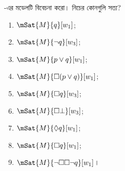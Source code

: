 \documentclass[../../../include/open-logic-section]{subfiles}
\begin{document}
\begin{prob}
  -এর মডেলটি বিবেচনা করো। নিচের কোনগুলি সত্য?
    \begin{enumerate}
    \item $\mSat{M}{q}[w_1]$;
    \item $\mSat{M}{\lnot q}[w_3]$;
    \item $\mSat{M}{p \lor q}[w_1]$;
    \item $\mSat{M}{\Box (p \lor q)}[w_1]$;
    \item $\mSat{M}{\Box q}[w_3]$;
    \item $\mSat{M}{\Box \bot}[w_3]$;
    \item $\mSat{M}{\Diamond q}[w_1]$;
    \item $\mSat{M}{\Box q}[w_1]$;
    \item $\mSat{M}{\lnot \Box\Box \lnot q}[w_1]$।
    \end{enumerate}
\end{prob}
\end{document}

